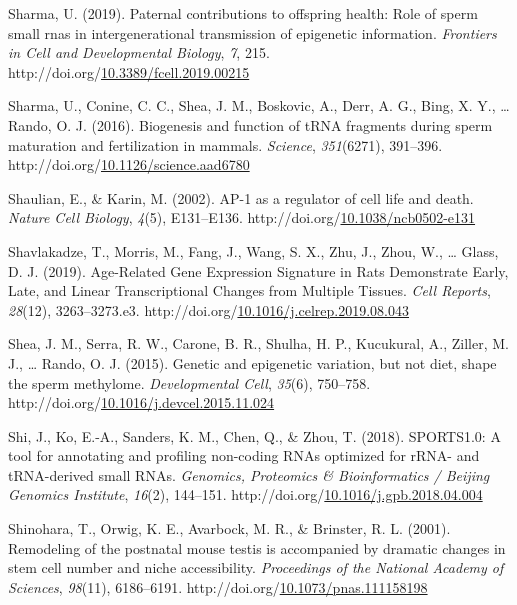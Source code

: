 \documentclass[12pt,twoside]{reedthesis}
\newlength{\cslhangindent}
\newenvironment{CSLReferences}[2] %
 {%
  \setlength{\parindent}{0pt}
  \ifodd #1 \everypar{\setlength{\hangindent}{\cslhangindent}}\ignorespaces\fi
  \ifnum #2 > 0
  \setlength{\parskip}{#2\baselineskip}
  \fi
 }%
 {}
\begin{document}
\begin{CSLReferences}{1}{0}
\leavevmode{}%
Sharma, U. (2019). Paternal contributions to offspring health: Role of sperm small rnas in intergenerational transmission of epigenetic information. \emph{Frontiers in Cell and Developmental Biology}, \emph{7}, 215. http://doi.org/\href{https://doi.org/10.3389/fcell.2019.00215}{10.3389/fcell.2019.00215}

\leavevmode{}%
Sharma, U., Conine, C. C., Shea, J. M., Boskovic, A., Derr, A. G., Bing, X. Y., \ldots{} Rando, O. J. (2016). Biogenesis and function of {tRNA} fragments during sperm maturation and fertilization in mammals. \emph{Science}, \emph{351}(6271), 391--396. http://doi.org/\href{https://doi.org/10.1126/science.aad6780}{10.1126/science.aad6780}

\leavevmode{}%
Shaulian, E., \& Karin, M. (2002). AP-1 as a regulator of cell life and death. \emph{Nature Cell Biology}, \emph{4}(5), E131--E136. http://doi.org/\href{https://doi.org/10.1038/ncb0502-e131}{10.1038/ncb0502-e131}

\leavevmode{}%
Shavlakadze, T., Morris, M., Fang, J., Wang, S. X., Zhu, J., Zhou, W., \ldots{} Glass, D. J. (2019). Age-Related Gene Expression Signature in Rats Demonstrate Early, Late, and Linear Transcriptional Changes from Multiple Tissues. \emph{Cell Reports}, \emph{28}(12), 3263--3273.e3. http://doi.org/\href{https://doi.org/10.1016/j.celrep.2019.08.043}{10.1016/j.celrep.2019.08.043}

\leavevmode{}%
Shea, J. M., Serra, R. W., Carone, B. R., Shulha, H. P., Kucukural, A., Ziller, M. J., \ldots{} Rando, O. J. (2015). Genetic and epigenetic variation, but not diet, shape the sperm methylome. \emph{Developmental Cell}, \emph{35}(6), 750--758. http://doi.org/\href{https://doi.org/10.1016/j.devcel.2015.11.024}{10.1016/j.devcel.2015.11.024}

\leavevmode{}%
Shi, J., Ko, E.-A., Sanders, K. M., Chen, Q., \& Zhou, T. (2018). SPORTS1.0: A tool for annotating and profiling non-coding RNAs optimized for rRNA- and tRNA-derived small RNAs. \emph{Genomics, Proteomics \& Bioinformatics / Beijing Genomics Institute}, \emph{16}(2), 144--151. http://doi.org/\href{https://doi.org/10.1016/j.gpb.2018.04.004}{10.1016/j.gpb.2018.04.004}

\leavevmode{}%
Shinohara, T., Orwig, K. E., Avarbock, M. R., \& Brinster, R. L. (2001). Remodeling of the postnatal mouse testis is accompanied by dramatic changes in stem cell number and niche accessibility. \emph{Proceedings of the National Academy of Sciences}, \emph{98}(11), 6186--6191. http://doi.org/\href{https://doi.org/10.1073/pnas.111158198}{10.1073/pnas.111158198}


\end{CSLReferences}
\end{document}
